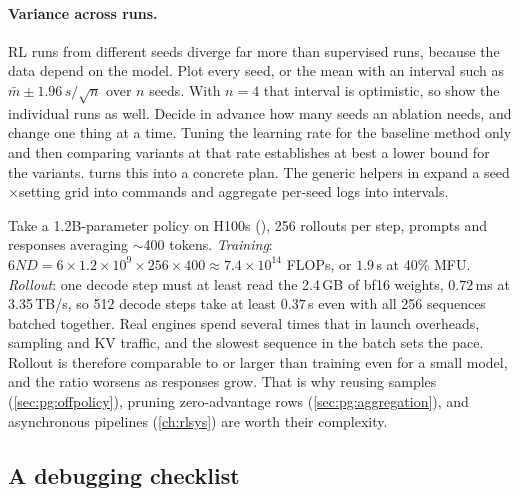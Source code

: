 \paragraph{Variance across runs.} RL runs from different seeds diverge far more than
supervised runs, because the data depend on the model. Plot every seed, or the mean with an
interval such as $\bar m\pm1.96\,s/\sqrt{n}$ over $n$ seeds. With $n=4$ that interval is
optimistic, so show the individual runs as well. Decide in advance how many seeds an ablation
needs, and change one thing at a time. Tuning the learning rate for the baseline method only
and then comparing variants at that rate establishes at best a lower bound for the variants.
 turns this into a concrete plan. The generic helpers in
 expand a seed$\times$setting grid into commands and aggregate
per-seed logs into intervals.

\begin{napkinmath}
Take a 1.2B-parameter policy on H100s (), 256 rollouts per step,
prompts and responses averaging $\sim$400 tokens. \emph{Training}: $6ND=6\times1.2\times10^9
\times256\times400\approx7.4\times10^{14}$ FLOPs, or $1.9$\,s at 40\% MFU. \emph{Rollout}: one
decode step must at least read the 2.4\,GB of bf16 weights, $0.72$\,ms at 3.35\,TB/s, so 512
decode steps take at least $0.37$\,s even with all 256 sequences batched together. Real engines
spend several times that in launch overheads, sampling and KV traffic, and the slowest sequence
in the batch sets the pace. Rollout is therefore comparable to or larger than training even for
a small model, and the ratio worsens as responses grow. That is why reusing samples
(\cref{sec:pg:offpolicy}), pruning zero-advantage rows (\cref{sec:pg:aggregation}), and
asynchronous pipelines (\cref{ch:rlsys}) are worth their complexity.
\end{napkinmath}

\subsection{A debugging checklist}

